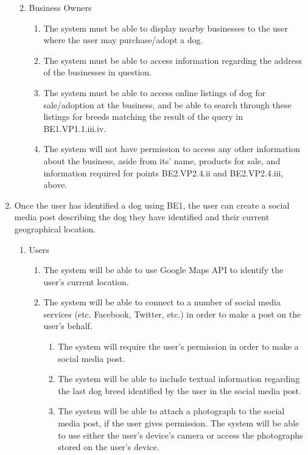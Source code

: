 \documentclass[]{article}
\begin{document}
\begin{enumerate}[{BE}1.]
\begin{enumerate}[{VP2}.1]
\begin{enumerate}
            \end{enumerate}
       	\item Business Owners
        	\begin{enumerate}
            \item The system must be able to display nearby businesses to the user where the user may purchase/adopt a dog.
			\item The system must be able to access information regarding the address of the businesses in question.
			\item The system must be able to access online listings of dog for sale/adoption at the business, and be able to search through these listings for breeds matching the result of the query in BE1.VP1.1.iii.iv.
			\item The system will not have permission to access any other information about the business, aside from its’ name, products for sale, and information required for points BE2.VP2.4.ii and BE2.VP2.4.iii, above.
            \end{enumerate}
	\end{enumerate}
    \item Once the user has identified a dog using BE1, the user can create a social media post describing the dog they have identified and their current geographical location.
    	\begin{enumerate}[{VP3}.1]
        \item Users
        	\begin{enumerate}
            \item The system will be able to use Google Maps API to identify the user's current location.
            \item The system will be able to connect to a number of social media services (etc. Facebook, Twitter, etc.) in order to make a post on the user's behalf.
            	\begin{enumerate}[{ii}.i]
            	\item The system will require the user's permission in order to make a social media post.
            	\item The system will be able to include textual information regarding the last dog breed identified by the user in the social media post.
            	\item The system will be able to attach a photograph to the social media post, if the user gives permission. The system will be able to use either the user's device's camera or access the photographs stored on the user's device.

\end{enumerate}
\end{enumerate}
\end{enumerate}
\end{enumerate}
\end{document}
